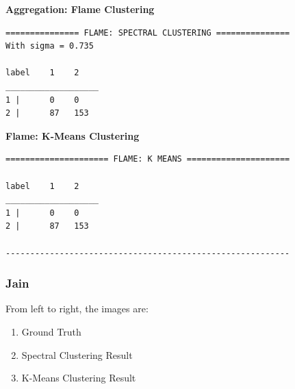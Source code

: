 \documentclass[11pt]{article}
\begin{document}
\textbf{Aggregation: Flame Clustering} 
\begin{verbatim}
=============== FLAME: SPECTRAL CLUSTERING ===============
With sigma = 0.735

label    1    2    
___________________
1 |      0    0    
2 |      87   153    

\end{verbatim}
\textbf{Flame: K-Means Clustering} 
\begin{verbatim}
===================== FLAME: K MEANS =====================

label    1    2    
___________________
1 |      0    0    
2 |      87   153    

----------------------------------------------------------

\end{verbatim}
\subsubsection*{Jain} 
From left to right, the images are:
\begin{enumerate}
\item Ground Truth
\item Spectral Clustering Result
\item K-Means Clustering Result
\end{enumerate}
\end{document}
